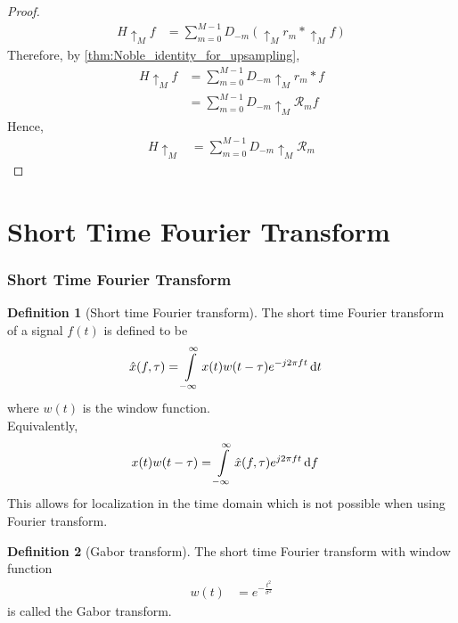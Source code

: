 \documentclass[titlepage, fleqn, a4paper, 12pt, twoside]{article}
\theoremstyle{definition}
\newtheorem{definition}{Definition}
\theoremstyle{theorem}
\def\upsample#1{\uparrow_{#1}}
\begin{document}
\begin{proof}
	\begin{align*}
		H \upsample{M} f &= \sum\limits_{m = 0}^{M - 1} D_{-m} \left( \upsample{M} r_m \ast \upsample{M} f \right)
	\end{align*}
	Therefore, by \cref{thm:Noble_identity_for_upsampling},
	\begin{align*}
		H \upsample{M} f &= \sum\limits_{m = 0}^{M - 1} D_{-m} \upsample{M} r_m \ast f\\
		&= \sum\limits_{m = 0}^{M - 1} D_{-m} \upsample{M} \mathcal{R}_m f
	\end{align*}
	Hence,
	\begin{align*}
		H \upsample{M} &= \sum\limits_{m = 0}^{M - 1} D_{-m} \upsample{M} \mathcal{R}_m
	\end{align*}
\end{proof}

\clearpage
\part{Short Time Fourier Transform}

\section{Short Time Fourier Transform}

\begin{definition}[Short time Fourier transform]
	The short time Fourier transform of a signal $f(t)$ is defined to be
	\begin{align*}
		\hat{x}(f,\tau) &= \int\limits_{-\infty}^{\infty} x(t) w(t - \tau) e^{-j 2 \pi f t} \dif t
	\end{align*}
	where $w(t)$ is the window function.\\
	Equivalently,
	\begin{align*}
		x(t) w(t - \tau) &= \int\limits_{-\infty}^{\infty} \hat{x}(f,\tau) e^{j 2 \pi f t} \dif f
	\end{align*}
	This allows for localization in the time domain which is not possible when using Fourier transform.
\end{definition}

\begin{definition}[Gabor transform]
	The short time Fourier transform with window function
	\begin{align*}
		w(t) &= e^{-\frac{t^2}{\sigma^2}}
	\end{align*}
	is called the Gabor transform.
\end{definition}

\clearpage
\printindex
\end{document}
